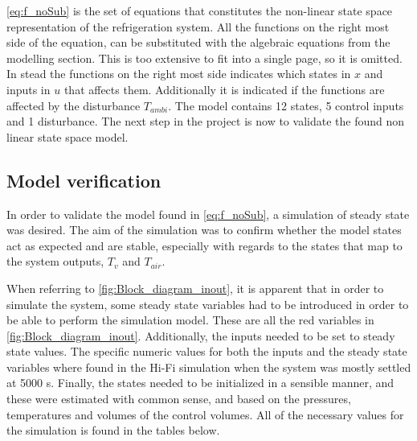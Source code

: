 \cref{eq:f_noSub} is the set of equations that constitutes the non-linear state space representation of the refrigeration system. All the functions on the right most side of the equation, can be substituted with the algebraic equations from the modelling section. This is too extensive to fit into a single page, so it is omitted. In stead the functions on the right most side indicates which states in $ x $ and inputs in $ u $ that affects them. Additionally it is indicated if the functions are affected by the disturbance $ T_{ambi} $. The model contains 12 states, 5 control inputs and 1 disturbance. The next step in the project is now to validate the found non linear state space model.

\newpage
\subsection{Model verification}\label{sec:model-verification}
In order to validate the model found in \cref{eq:f_noSub}, a simulation of steady state was desired. The aim of the simulation was to confirm whether the model states act as expected and are stable, especially with regards to the states that map to the system outputs, $T_v$ and $T_{air}$.

When referring to \cref{fig:Block_diagram_inout}, it is apparent that in order to simulate the system, some steady state variables had to be introduced in order to be able to perform the simulation model. These are all the red variables in \cref{fig:Block_diagram_inout}. Additionally, the inputs needed to be set to steady state values. The specific numeric values for both the inputs and the steady state variables where found in the Hi-Fi simulation when the system was mostly settled at 5000 s. Finally, the states needed to be initialized in a sensible manner, and these were estimated with common sense, and based on the pressures, temperatures and volumes of the control volumes. All of the necessary values for the simulation is found in the tables below.

